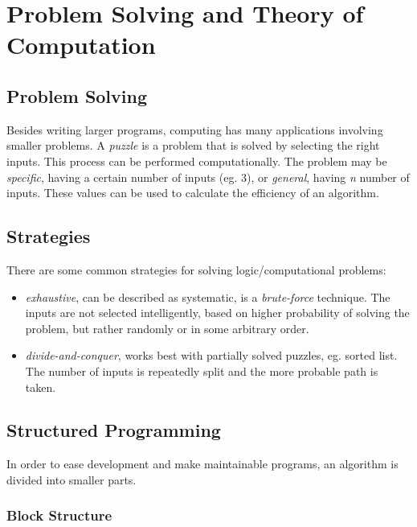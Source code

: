 \documentclass[9pt]{article}
\let\oldsection\section
\renewcommand\section{\clearpage\oldsection}
\begin{document}
\section{Problem Solving and Theory of Computation}
\label{sec:orge84e200}
\subsection{Problem Solving}
\label{sec:org03baaf4}

Besides writing larger programs, computing has many applications involving smaller problems. A \emph{puzzle} is a problem that is solved by selecting the right inputs. This process can be performed computationally. The problem may be \emph{specific}, having a certain number of inputs (eg. 3), or \emph{general}, having \emph{n} number of inputs. These values can be used to calculate the efficiency of an algorithm.

\subsection{Strategies}
\label{sec:org943c561}

There are some common strategies for solving logic/computational problems:

\begin{itemize}
\item \emph{exhaustive}, can be described as systematic, is a \emph{brute-force} technique. The inputs are not selected intelligently, based on higher probability of solving the problem, but rather randomly or in some arbitrary order.
\item \emph{divide-and-conquer}, works best with partially solved puzzles, eg. sorted list. The number of inputs is repeatedly split and the more probable path is taken.
\end{itemize}

\subsection{Structured Programming}
\label{sec:org7f9497f}

In order to ease development and make maintainable programs, an algorithm is divided into smaller parts.

\subsubsection{Block Structure}
\label{sec:org3501181}
\end{document}
